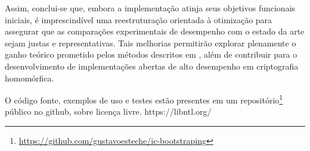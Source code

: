 Assim, conclui-se que, embora a implementação atinja seus objetivos funcionais iniciais, é imprescindível uma reestruturação orientada à otimização para assegurar que as comparações experimentais de desempenho com o estado da arte sejam justas e representativas. Tais melhorias permitirão explorar plenamente o ganho teórico prometido pelos métodos descritos em \cite{Guimaraes2023Amortized, lw23I}, além de contribuir para o desenvolvimento de implementações abertas de alto desempenho em criptografia homomórfica. 

O código fonte, exemplos de uso e testes estão presentes em um repositório\footnote{\url{https://github.com/gustavoesteche/ic-bootstraping}} público no github, sobre licença livre. https://libntl.org/


